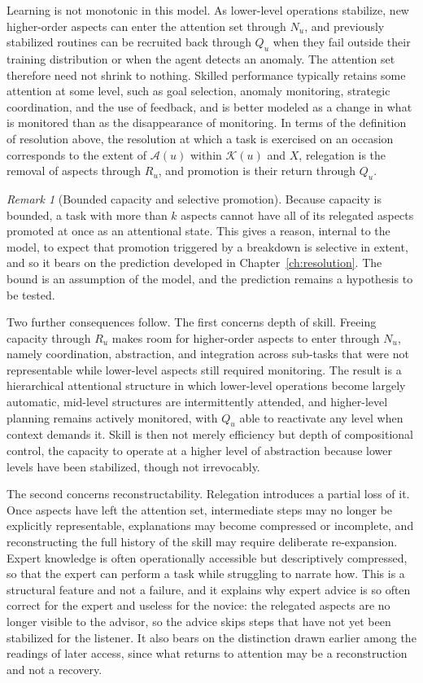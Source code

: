 \documentclass[11pt]{report}
\theoremstyle{remark}
\newtheorem{remark}{Remark}[chapter]
\theoremstyle{definition}
\begin{document}
Learning is not monotonic in this model. As lower-level operations stabilize, new higher-order aspects can enter the attention set through $N_u$, and previously stabilized routines can be recruited back through $Q_u$ when they fail outside their training distribution or when the agent detects an anomaly. The attention set therefore need not shrink to nothing. Skilled performance typically retains some attention at some level, such as goal selection, anomaly monitoring, strategic coordination, and the use of feedback, and is better modeled as a change in what is monitored than as the disappearance of monitoring. In terms of the definition of resolution above, the resolution at which a task is exercised on an occasion corresponds to the extent of $\mathcal{A}(u)$ within $\mathcal{K}(u)$ and $X$, relegation is the removal of aspects through $R_u$, and promotion is their return through $Q_u$.

\begin{remark}[Bounded capacity and selective promotion]
Because capacity is bounded, a task with more than $k$ aspects cannot have all of its relegated aspects promoted at once as an attentional state. This gives a reason, internal to the model, to expect that promotion triggered by a breakdown is selective in extent, and so it bears on the prediction developed in Chapter~\ref{ch:resolution}. The bound is an assumption of the model, and the prediction remains a hypothesis to be tested.
\end{remark}

Two further consequences follow. The first concerns depth of skill. Freeing capacity through $R_u$ makes room for higher-order aspects to enter through $N_u$, namely coordination, abstraction, and integration across sub-tasks that were not representable while lower-level aspects still required monitoring. The result is a hierarchical attentional structure in which lower-level operations become largely automatic, mid-level structures are intermittently attended, and higher-level planning remains actively monitored, with $Q_u$ able to reactivate any level when context demands it. Skill is then not merely efficiency but depth of compositional control, the capacity to operate at a higher level of abstraction because lower levels have been stabilized, though not irrevocably.

The second concerns reconstructability. Relegation introduces a partial loss of it. Once aspects have left the attention set, intermediate steps may no longer be explicitly representable, explanations may become compressed or incomplete, and reconstructing the full history of the skill may require deliberate re-expansion. Expert knowledge is often operationally accessible but descriptively compressed, so that the expert can perform a task while struggling to narrate how. This is a structural feature and not a failure, and it explains why expert advice is so often correct for the expert and useless for the novice: the relegated aspects are no longer visible to the advisor, so the advice skips steps that have not yet been stabilized for the listener. It also bears on the distinction drawn earlier among the readings of later access, since what returns to attention may be a reconstruction and not a recovery.
\end{document}
